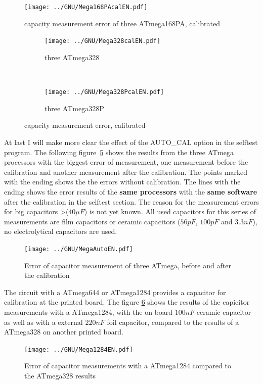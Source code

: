 \begin{figure}[H]
\centering
\texttt{[image: ../GNU/Mega168PAcalEN.pdf]}
\caption{capacity measurement error of three ATmega168PA, calibrated}
\label{fig:mega168PAcal}
\end{figure}

\begin{figure}[H]
  \begin{subfigure}[b]{.5\textwidth}
    \centering
    \texttt{[image: ../GNU/Mega328calEN.pdf]}
    \caption{three ATmega328}
    \label{fig:mega328cal}
  \end{subfigure}
  ~
  \begin{subfigure}[b]{.5\textwidth}
    \centering
    \texttt{[image: ../GNU/Mega328PcalEN.pdf]}
    \caption{three ATmega328P}
    \label{fig:mega328Pcal}
  \end{subfigure}
  \caption{capacity measurement error, calibrated}
\end{figure}

At last I will make more clear the effect of the AUTO\_CAL option in the selftest program.
The following figure~\ref{fig:MegaAuto} shows the results from the three ATmega processors
with the biggest error of measurement, one measurement before the calibration and another
measurement after the calibration.
The points marked with the ending  shows the the errors without calibration.
The lines with the ending  shows the error results of the \textbf {same processors} 
with the \textbf {same software} after the calibration in the selftest section.
The reason for the measurement errors for big capacitors \textgreater(\(40\mu F\)) is
not yet known. All used capacitors for this series of measurements are film capacitors or
ceramic capacitors (\(56pF\), \(100pF\) and \(3.3nF\)), no electrolytical capacitors are used.

\begin{figure}[H]
\centering
\texttt{[image: ../GNU/MegaAutoEN.pdf]}
\caption{Error of capacitor measurement of three ATmega, before and after the calibration}
\label{fig:MegaAuto}
\end{figure}

The circuit with a ATmega644 or ATmega1284 provides a capacitor for calibration at the printed board.
The figure \ref{fig:Mega1284} shows the results of the capicitor measurements with a ATmega1284,
with the on board \(100nF\) ceramic capacitor as well as with a external \(220nF\) foil capacitor, compared
to the results of a ATmega328 on another printed board.

\begin{figure}[H]
\centering
\texttt{[image: ../GNU/Mega1284EN.pdf]}
\caption{Error of capacitor measurements with a ATmega1284 compared to the ATmega328 results}
\label{fig:Mega1284}
\end{figure}

